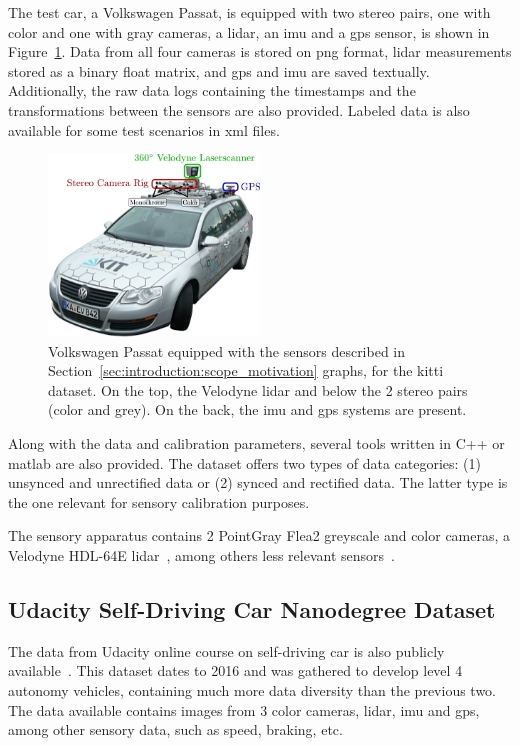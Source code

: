 The test car, a Volkswagen Passat, is equipped with two stereo pairs, one with color and one with gray cameras, a \ac{lidar}, an \ac{imu} and a \ac{gps} sensor, is shown in Figure~\ref{fig:sota:kitti_sensors}. Data from all four cameras is stored on \ac{png} format, \ac{lidar} measurements stored as a binary float matrix, and \ac{gps} and \ac{imu} are saved textually. Additionally, the raw data logs containing the timestamps and the transformations between the sensors are also provided. Labeled data is also available for some test scenarios in \ac{xml} files.

\begin{figure}[!ht]
	\centering
	\includegraphics[width=0.5\textwidth]{img/sensor_fusion/passat_sensors.jpg}
	\caption[Volkswagen Passat used for recording \acs{kitti} dataset.]{Volkswagen Passat equipped with the sensors described in Section~\ref{sec:introduction:scope_motivation} graphs, for the \ac{kitti} dataset. On the top, the Velodyne \ac{lidar} and below the 2 stereo pairs (color and grey). On the back, the \ac{imu} and \ac{gps} systems are present.}
	\label{fig:sota:kitti_sensors}
\end{figure}


Along with the data and calibration parameters, several tools written in C++ or \ac{matlab} are also provided. The dataset offers two types of data categories: (1) unsynced and unrectified data or (2) synced and rectified data. The latter type is the one relevant for sensory calibration purposes.

The sensory apparatus contains 2 PointGray Flea2 greyscale and color cameras, a Velodyne HDL-64E \ac{lidar}~\cite{VelodyneHDL64}, among others less relevant sensors~\cite{Geiger2013a}.

\subsection{Udacity Self-Driving Car Nanodegree Dataset}
The data from Udacity online course on self-driving car is also publicly available~\cite{udacity}. This dataset dates to 2016 and was gathered to develop level 4 autonomy vehicles, containing much more data diversity than the previous two. The data available contains images from 3 color cameras,  \ac{lidar}, \ac{imu} and \ac{gps}, among other sensory data, such as speed, braking, etc.

